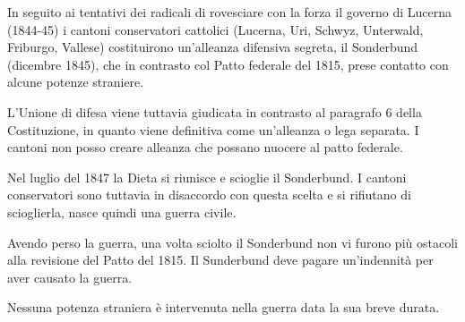 \documentclass[a4paper]{article}
\begin{document}
In seguito ai tentativi dei radicali di rovesciare con la forza il governo di Lucerna (1844-45)
i cantoni conservatori cattolici (Lucerna, Uri, Schwyz, Unterwald, Friburgo, Vallese)
costituirono un'alleanza difensiva segreta, il Sonderbund (dicembre 1845), che in
contrasto col Patto federale del 1815, prese contatto con alcune potenze straniere.

\begin{center}
\end{center}



L'Unione di difesa viene tuttavia giudicata in contrasto al paragrafo 6 della Costituzione, in quanto
viene definitiva come un'alleanza o lega separata.
I cantoni non posso creare alleanza che possano nuocere al patto federale.

Nel luglio del 1847 la Dieta si riunisce e scioglie il Sonderbund.
I cantoni conservatori sono tuttavia in disaccordo con questa scelta e si rifiutano di scioglierla,
nasce quindi una guerra civile.

Avendo perso la guerra, una volta sciolto il Sonderbund non vi furono più ostacoli alla revisione del Patto del 1815.
Il Sunderbund deve pagare un'indennità per aver causato la guerra.


Nessuna potenza straniera è intervenuta nella guerra data la sua breve durata.
\end{document}

